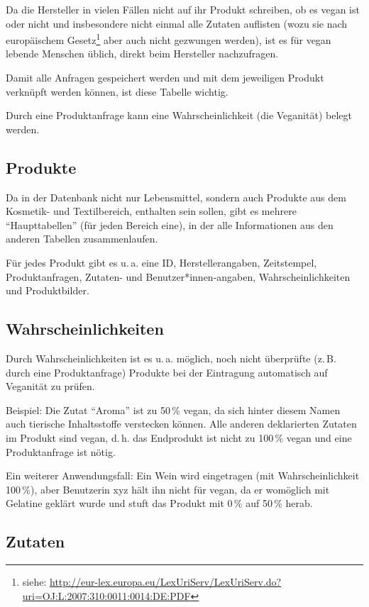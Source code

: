 \documentclass[a4paper]{report}
\begin{document}
Da die Hersteller in vielen Fällen nicht auf ihr Produkt
schreiben, ob es vegan ist oder nicht und insbesondere nicht einmal
alle Zutaten auflisten (wozu sie nach europäischem Gesetz\footnote{siehe:
\url{http://eur-lex.europa.eu/LexUriServ/LexUriServ.do?uri=OJ:L:2007:310:0011:0014:DE:PDF}}
aber auch nicht gezwungen werden),
ist es für vegan lebende Menschen üblich, direkt beim
Hersteller nachzufragen.

Damit alle Anfragen gespeichert werden und mit dem jeweiligen Produkt
verknüpft werden können, ist diese Tabelle wichtig.

Durch eine Produktanfrage kann eine Wahrscheinlichkeit (die Veganität)
belegt werden.

\subsection{Produkte}

Da in der Datenbank nicht nur Lebensmittel, sondern auch Produkte aus
dem Kosmetik- und Textilbereich, enthalten sein sollen, gibt es
mehrere ``Haupttabellen'' (für jeden Bereich eine), in der alle Informationen
aus den anderen Tabellen zusammenlaufen.

Für jedes Produkt gibt es u.\,a. eine ID, Herstellerangaben, Zeitstempel,
Produktanfragen, Zutaten- und Benutzer*innen-angaben,
Wahrscheinlichkeiten und Produktbilder.

\subsection{Wahrscheinlichkeiten}

Durch Wahrscheinlichkeiten ist es u.\,a. möglich, noch nicht überprüfte
(z.\,B. durch eine Produktanfrage) Produkte bei der Eintragung
automatisch auf Veganität zu prüfen.

Beispiel: Die Zutat ``Aroma'' ist zu 50\,\% vegan, da sich
hinter diesem Namen auch tierische Inhaltsstoffe verstecken können. Alle
anderen deklarierten Zutaten im Produkt sind vegan, d.\,h. das Endprodukt ist nicht
zu 100\,\% vegan und eine Produktanfrage ist nötig.

Ein weiterer Anwendungsfall: Ein Wein wird eingetragen (mit
Wahrscheinlichkeit 100\,\%), aber
Benutzerin xyz hält ihn nicht für vegan, da er womöglich mit
Gelatine geklärt wurde und stuft das Produkt mit 0\,\% auf 50\,\% herab.

\subsection{Zutaten}
\end{document}

